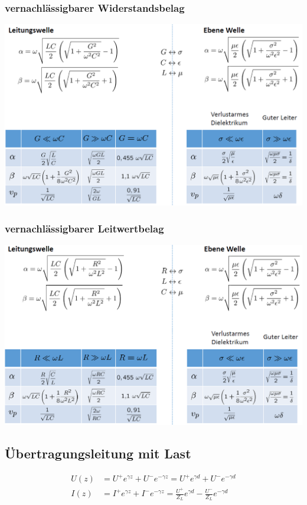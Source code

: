 \subsubsection{vernachlässigbarer Widerstandsbelag}
\includegraphics[width=\columnwidth]{Figures/vernachlaessigbarerWiderstandsbelag.png}


\subsubsection{vernachlässigbarer Leitwertbelag}
\includegraphics[width=\columnwidth]{Figures/vernachlaessigbarerLeiterwertbelag.png}

\subsection{Übertragungsleitung mit Last}



\begin{align*}
    U(z) & = U^+ e^{\gamma z} + U^- e^{-\gamma z} = U^+ e^{\gamma d} + U^ - e^{-\gamma d}                      \\
    I(z) & = I^+ e^{\gamma z} + I^- e^{-\gamma z} = \frac{U^+}{Z_L}e^{\gamma d} - \frac{U^-}{Z_L}e^{-\gamma d}
\end{align*}

